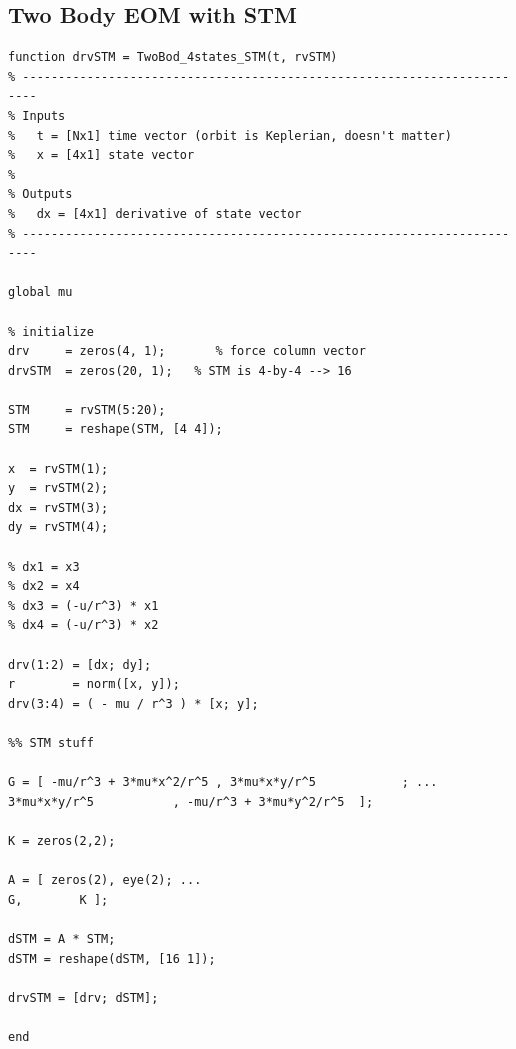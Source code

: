 \documentclass[conf]{new-aiaa}
\begin{document}
\subsection*{Two Body EOM with STM} 
\begin{lstlisting}
function drvSTM = TwoBod_4states_STM(t, rvSTM)
% ------------------------------------------------------------------------
% Inputs 
%   t = [Nx1] time vector (orbit is Keplerian, doesn't matter) 
%   x = [4x1] state vector 
% 
% Outputs 
%   dx = [4x1] derivative of state vector 
% ------------------------------------------------------------------------

global mu 

% initialize 
drv     = zeros(4, 1);       % force column vector 
drvSTM  = zeros(20, 1);   % STM is 4-by-4 --> 16 

STM     = rvSTM(5:20); 
STM     = reshape(STM, [4 4]); 

x  = rvSTM(1); 
y  = rvSTM(2); 
dx = rvSTM(3); 
dy = rvSTM(4); 

% dx1 = x3 
% dx2 = x4 
% dx3 = (-u/r^3) * x1
% dx4 = (-u/r^3) * x2

drv(1:2) = [dx; dy]; 
r        = norm([x, y]); 
drv(3:4) = ( - mu / r^3 ) * [x; y]; 

%% STM stuff 

G = [ -mu/r^3 + 3*mu*x^2/r^5 , 3*mu*x*y/r^5            ; ... 
3*mu*x*y/r^5           , -mu/r^3 + 3*mu*y^2/r^5  ]; 

K = zeros(2,2); 

A = [ zeros(2), eye(2); ... 
G,        K ]; 

dSTM = A * STM; 
dSTM = reshape(dSTM, [16 1]); 

drvSTM = [drv; dSTM]; 

end 
\end{lstlisting}



\end{document}
